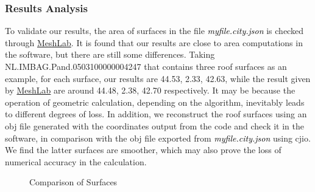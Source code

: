 \documentclass[12pt]{article}
\begin{document}
\subsubsection*{Results Analysis}
To validate our results, the area of surfaces in the file \textcolor{black}{\textit{myfile.city.json}} is checked through \href{https://www.meshlab.net/}{MeshLab}. It is found that our results are close to area computations in the software, but there are still some differences. Taking NL.IMBAG.Pand.0503100000004247 that contains three roof surfaces as an example, for each surface, our results are 44.53, 2.33, 42.63, while the result given by \href{https://www.meshlab.net/}{MeshLab} are around 44.48,  2.38, 42.70 respectively. It may be because the operation of geometric calculation, depending on the algorithm, inevitably leads to different degrees of loss. In addition, we reconstruct the roof surfaces using an obj file generated with the coordinates output from the code and check it in the software, in comparison with  the obj file exported from \textcolor{black}{\textit{myfile.city.json}} using cjio. We find the latter surfaces are smoother, which may also prove the loss of numerical accuracy in the calculation. 


\begin{figure}[htbp]
\centering
{}
\caption{Comparison of Surfaces}
\end{figure}
\end{document}
